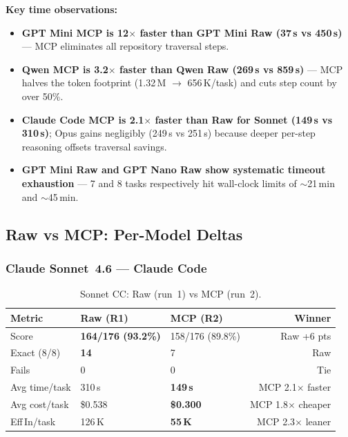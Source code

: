 \noindent
\textbf{Key time observations:}
\begin{itemize}[nosep, leftmargin=*]
  \item \textbf{GPT Mini MCP is 12$\times$ faster than GPT Mini Raw (37\,s vs 450\,s)} ---
        MCP eliminates all repository traversal steps.
  \item \textbf{Qwen MCP is 3.2$\times$ faster than Qwen Raw (269\,s vs 859\,s)} ---
        MCP halves the token footprint (1.32\,M $\to$ 656\,K/task) and
        cuts step count by over 50\%.
  \item \textbf{Claude Code MCP is 2.1$\times$ faster than Raw for Sonnet (149\,s vs 310\,s)};
        Opus gains negligibly (249\,s vs 251\,s) because deeper per-step reasoning offsets
        traversal savings.
  \item \textbf{GPT Mini Raw and GPT Nano Raw show systematic timeout exhaustion} ---
        7 and 8 tasks respectively hit wall-clock limits of $\sim$21\,min and $\sim$45\,min.
\end{itemize}

\subsection{Raw vs MCP: Per-Model Deltas}

\subsubsection{Claude Sonnet~4.6 --- Claude Code}

\begin{table}[h]
\centering
\caption{Sonnet CC: Raw (run~1) vs MCP (run~2).}\label{tab:delta-sonnet-cc}
\begin{tabular}{lllr}
\toprule
\textbf{Metric} & \textbf{Raw (R1)} & \textbf{MCP (R2)} & \textbf{Winner} \\
\midrule
Score          & \textbf{164/176 (93.2\%)} & 158/176 (89.8\%) & Raw +6 pts \\
Exact (8/8)    & \textbf{14}               & 7                 & Raw \\
Fails          & 0                         & 0                 & Tie \\
Avg time/task  & 310\,s                    & \textbf{149\,s}   & MCP 2.1$\times$ faster \\
Avg cost/task  & \$0.538                   & \textbf{\$0.300}  & MCP 1.8$\times$ cheaper \\
Eff\,In/task   & 126\,K                    & \textbf{55\,K}    & MCP 2.3$\times$ leaner \\
\bottomrule
\end{tabular}
\end{table}

